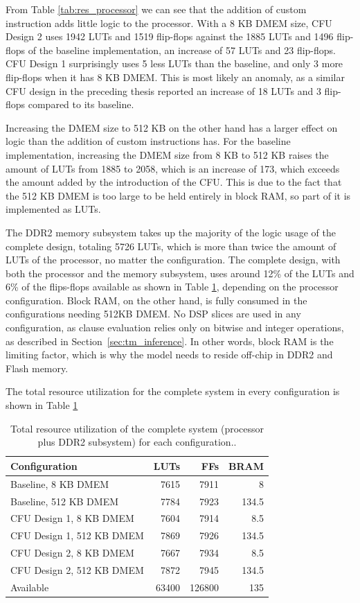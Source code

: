 From Table \ref{tab:res_processor} we can see that the addition of custom instruction adds little logic to the processor. With a 8 KB DMEM size, CFU Design 2 uses 1942 LUTs and 1519 flip-flops against the 1885 LUTs and 1496 flip-flops of the baseline implementation, an increase of 57 LUTs and 23 flip-flops. CFU Design 1 surprisingly uses 5 less LUTs than the baseline, and only 3 more flip-flops when it has 8 KB DMEM. This is most likely an anomaly, as a similar CFU design in the preceding thesis \cite{JB2025} reported an increase of 18 LUTs and 3 flip-flops compared to its baseline. 

Increasing the DMEM size to 512 KB on the other hand has a larger effect on logic than the addition of custom instructions has. For the baseline implementation, increasing the DMEM size from 8 KB to 512 KB raises the amount of LUTs from 1885 to 2058, which is an increase of 173, which exceeds the amount added by the introduction of the CFU.  This is due to the fact that the 512 KB DMEM is too large to be held entirely in block RAM, so part of it is implemented as LUTs.

The DDR2 memory subsystem takes up the majority of the logic usage of the complete design, totaling 5726 LUTs, which is more than twice the amount of LUTs of the processor, no matter the configuration. The complete design, with both the processor and the memory subsystem, uses around 12\% of the LUTs and 6\% of the flips-flops available as shown in Table \ref{tab:res_total}, depending on the processor configuration. Block RAM, on the other hand, is fully consumed in the configurations needing 512KB DMEM. No DSP slices are used in any configuration, as clause evaluation relies only on bitwise and integer operations, as described in Section~\ref{sec:tm_inference}. In other words, block RAM is the limiting factor, which is why the model needs to reside off-chip in DDR2 and Flash memory. 


The total resource utilization for the complete system in every configuration is shown in Table \ref{tab:res_total}

\begin{table}[H]
\centering
\caption{Total resource utilization of the complete system (processor plus DDR2
subsystem) for each configuration..}
\label{tab:res_total}
\begin{tabular}{|l|r|r|r|}
\hline
Configuration & LUTs & FFs & BRAM \\ \hline
Baseline, 8 KB DMEM       & 7615 & 7911 & 8     \\ \hline
Baseline, 512 KB DMEM     & 7784 & 7923 & 134.5 \\ \hline
CFU Design 1, 8 KB DMEM   & 7604 & 7914 & 8.5 \\ \hline
CFU Design 1, 512 KB DMEM & 7869 & 7926 & 134.5 \\ \hline
CFU Design 2, 8 KB DMEM   & 7667 & 7934 & 8.5 \\ \hline
CFU Design 2, 512 KB DMEM & 7872 & 7945 & 134.5 \\ \hline
Available                 & 63400 & 126800 & 135  \\ \hline
\end{tabular}
\end{table}